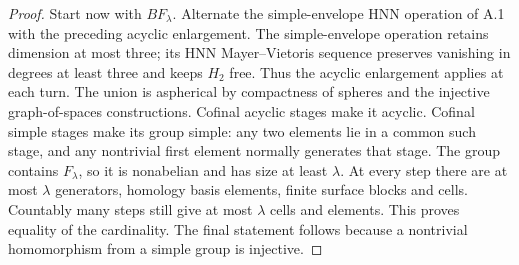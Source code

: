 \begin{proof}
Start now with $BF_\lambda$. Alternate the simple-envelope HNN
operation of A.1 with the preceding acyclic enlargement. The
simple-envelope operation retains dimension at most three;
its HNN Mayer--Vietoris sequence preserves vanishing in degrees
at least three and keeps $H_2$ free. Thus the acyclic enlargement
applies at each turn. The union is aspherical by compactness of
spheres and the injective graph-of-spaces constructions. Cofinal
acyclic stages make it acyclic. Cofinal simple stages make its
group simple: any two elements lie in a common such stage, and
any nontrivial first element normally generates that stage.
The group contains $F_\lambda$, so it is nonabelian and has size
at least $\lambda$. At every step there are at most $\lambda$
generators, homology basis elements, finite surface blocks and
cells. Countably many steps still give at most $\lambda$ cells
and elements. This proves equality of the cardinality.
The final statement follows because a nontrivial homomorphism
from a simple group is injective.
\end{proof}

